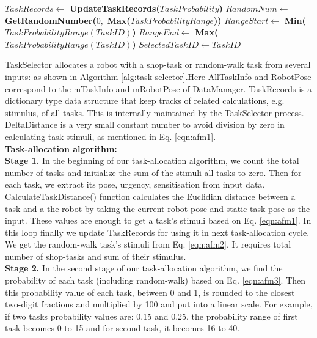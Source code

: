 \begin{small}
\begin{algorithmic}[1]
\State $ TaskRecords \gets  $ \textbf{UpdateTaskRecords(}$TaskProbability$\textbf{)}
\EndWhile
\State {}
\State $ RandomNum \gets  $ \textbf{GetRandomNumber(}$0,$ \textbf{Max(}$TaskProbabilityRange$\textbf{))}
\State $ RangeStart \gets  $ \textbf{Min(}$TaskProbabilityRange (TaskID)$\textbf{)}
\State $ RangeEnd \gets  $ \textbf{Max(}$TaskProbabilityRange (TaskID)$\textbf{)}
\State $ SelectedTaskID \gets TaskID $ 
\EndIf
\EndWhile
\end{algorithmic}
\end{small}
TaskSelector  allocates a robot with a shop-task or random-walk task from several inputs: as shown in Algorithm \ref{alg:task-selector}.Here  AllTaskInfo and RobotPose correspond to the mTaskInfo and mRobotPose of DataManager. TaskRecords is a dictionary type data structure that keep tracks of related calculations, e.g. stimulus, of all tasks. This is internally maintained by the TaskSelector process.  DeltaDistance is a very small constant number to avoid division by zero in calculating task stimuli, as mentioned in Eq. \ref{eqn:afm1}.\\
\textbf{Task-allocation algorithm:}\\
\textbf{Stage 1.} In the beginning of our task-allocation algorithm, we count the total number of tasks and initialize the sum of the stimuli all tasks to zero. Then for each task, we extract its pose, urgency, sensitisation from input data.  CalculateTaskDistance() function calculates the Euclidian distance between a task and a the robot by taking the current robot-pose and static task-pose as the input. These values are enough to get a task's stimuli based on Eq. \ref{eqn:afm1}. In this loop finally we update TaskRecords for using it in next task-allocation cycle. We get the random-walk task's stimuli from Eq. \ref{eqn:afm2}. It requires total number of shop-tasks and sum of their stimulus.\\ 
\textbf{Stage 2.} In the second stage of our task-allocation algorithm, we  find the probability of each task (including random-walk) based on Eq. \ref{eqn:afm3}. Then this probability value of each task, between 0 and 1, is rounded to the closest two-digit fractions and multiplied by 100 and put into a linear scale. For example, if two tasks probability values are: 0.15 and  0.25, the probability range of first  task becomes 0 to 15 and for second task, it becomes 16 to 40.\\
